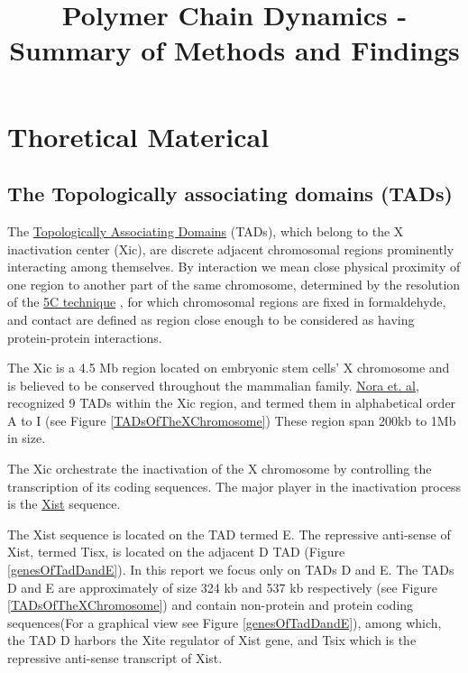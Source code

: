 \documentclass[12pt]{book}
\begin{document}
\title{Polymer Chain Dynamics - Summary of Methods and Findings}

\maketitle
\tableofcontents

\chapter{Thoretical Materical}
\section{The Topologically associating domains (TADs)}
The \href{http://www.nature.com/nature/journal/v485/n7398/full/nature11049.html}{Topologically Associating Domains} (TADs), which belong to the X inactivation center (Xic), are discrete adjacent chromosomal regions prominently interacting among themselves. By interaction we mean close physical proximity of one region to another part of the same chromosome, determined by the resolution of the \href{http://en.wikipedia.org/wiki/Chromosome_conformation_capture#Carbon-Copy_Chromosome_Conformation_Capture_.285C.29}{5C technique} \cite{dostie2006chromosome}\cite{de2012decade}, for which chromosomal regions are fixed in formaldehyde, and contact are defined as region close enough to be considered as having protein-protein interactions.

The Xic is a 4.5 Mb region located on embryonic stem cells' X chromosome and is believed to be conserved throughout the mammalian family.  \href{http://www.nature.com/nature/journal/v485/n7398/full/nature11049.html}{Nora et. al}\cite{nora2012spatial}, recognized 9 TADs within the Xic region, and termed them in alphabetical order A to I (see Figure \ref{TADsOfTheXChromosome}) These region span 200kb to 1Mb in size. 

The Xic orchestrate the inactivation of the X chromosome by controlling the transcription of its coding sequences. The major player in the inactivation process is the \href{http://en.wikipedia.org/wiki/XIST_(gene)#cite_note-2}{Xist} sequence.  

The Xist sequence is located on the TAD termed E. The repressive anti-sense of Xist, termed Tisx, is located on the adjacent D TAD (Figure \ref{genesOfTadDandE}). In this report we focus only on TADs D and E. The TADs D and E are approximately of size 324 kb and 537 kb respectively (see Figure \ref{TADsOfTheXChromosome}) and contain non-protein and protein coding sequences(For a graphical view see Figure \ref{genesOfTadDandE}), among which, the TAD D harbors the Xite regulator of Xist gene, and Tsix which is the repressive anti-sense transcript of Xist. 
\end{document}
